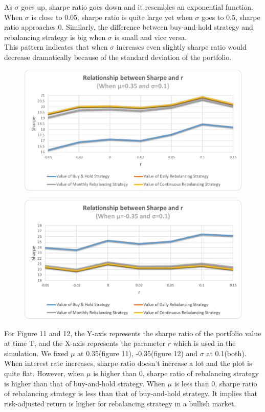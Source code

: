 \documentclass[
10pt, %
a4paper, %
oneside, %
headinclude,footinclude, %
BCOR5mm, %
]{scrartcl}
\begin{document}
As $\sigma$ goes up, sharpe ratio goes down and it resembles an exponential function. When $\sigma$ is close to 0.05, sharpe ratio is quite large yet when $\sigma$ goes to 0.5, sharpe ratio approaches 0. Similarly, the difference between buy-and-hold strategy and rebalancing strategy is big when $\sigma$ is small and vice versa.\\

This pattern indicates that when $\sigma$ increases even slightly sharpe ratio would decrease dramatically because of the standard deviation of the portfolio.\\

\begin{figure}[H]
	\centering
	\includegraphics[width=0.7\linewidth]{sharpe_r_035_010}
	\caption{}
	\label{fig:sharper035010}
\end{figure}

\begin{figure}[H]
	\centering
	\includegraphics[width=0.7\linewidth]{sharpe_r_-035_010}
	\caption{}
	\label{fig:sharper-035010}
\end{figure}
For Figure 11 and 12, the Y-axis represents the sharpe ratio of the portfolio value at time T, and the X-axis represents the parameter $r$ which is used in the simulation. We fixed $\mu$ at 0.35(figure 11), -0.35(figure 12) and $\sigma$ at 0.1(both).\\

When interest rate increases, sharpe ratio doesn’t increase a lot and the plot is quite flat. However,  when $\mu$ is higher than 0, sharpe ratio of rebalancing strategy is higher than that of buy-and-hold strategy. When $\mu$ is less than 0, sharpe ratio of rebalancing strategy is less than that of buy-and-hold strategy. It implies that risk-adjusted return is higher for rebalancing strategy in a bullish market.\\
\end{document}
